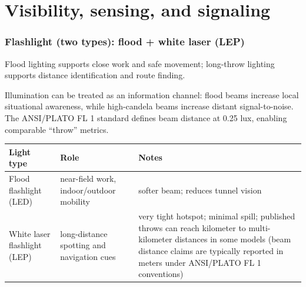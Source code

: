\section{Visibility, sensing, and signaling}

\begin{frame}[t]
  \frametitle{Flashlight (two types): flood + white laser (LEP)}
  \justifying
   Flood lighting supports close work and safe movement; long-throw lighting supports distance identification and route finding.

  \vspace{0.5em}
   Illumination can be treated as an information channel: flood beams increase local situational awareness, while high-candela beams increase distant signal-to-noise. The ANSI/PLATO FL 1 standard defines beam distance at 0.25 lux, enabling comparable ``throw'' metrics.~\cite{plato_fl1,streamlight_ansi}

  \vspace{0.8em}
  \TableBodySize
  \begin{table}
    \centering
    \begin{tabularx}{\textwidth}{@{}lX X@{}}
      \toprule
      \textbf{Light type} & \textbf{Role} & \textbf{Notes} \\
      \midrule
      Flood flashlight (LED) & near-field work, indoor/outdoor mobility & softer beam; reduces tunnel vision \\
      White laser flashlight (LEP) & long-distance spotting and navigation cues & very tight hotspot; minimal spill; published throws can reach kilometer to multi-kilometer distances in some models (beam distance claims are typically reported in meters under ANSI/PLATO FL 1 conventions)~\cite{lep_example_thor,acebeam_w50_20} \\
      \bottomrule
    \end{tabularx}
  \end{table}

\end{frame}

